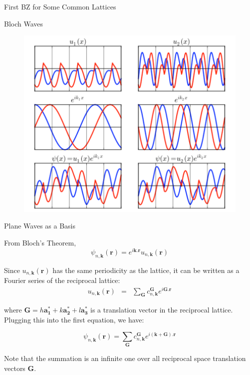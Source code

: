 \documentclass[aspectratio=169]{beamer}
\let \vec \mathbf
\begin{document}
\begin{frame}{First BZ for Some Common Lattices}
\end{frame} 

\begin{frame}{Bloch Waves}
\begin{figure}
    \centering
    \includegraphics[width=0.5\linewidth]{lectures/figures/7_Bloch_Waves.png}
\end{figure} 
\end{frame} 

\begin{frame}{Plane Waves as a Basis}

From Bloch's Theorem, 
\begin{equation*}
\psi_{n,\vec{k}}(\vec{r}) = e^{i\vec{k}.\vec{r}}u_{n,\vec{k}}(\vec{r})
\end{equation*} 

Since $u_{n,\vec{k}}(\vec{r})$ has the same periodicity as the lattice, it can be written as a Fourier series of the reciprocal lattice:
\begin{eqnarray*}
u_{n,\vec{k}}(\vec{r}) & = & \sum_{\vec{G}} c^{\vec{G}}_{n,\vec{k}} e^{i\vec{G}.\vec{r}}
\end{eqnarray*} 

where $\vec{G} = h \vec{a_1^*} + k \vec{a_2^*} + l \vec{a_3^*}$ is a translation vector in the reciprocal lattice. Plugging this into the first equation, we have:

\begin{equation*}
\psi_{n,\vec{k}}(\vec{r}) = \sum_{\vec{G}} c^{\vec{G}}_{n,\vec{k}} e^{i(\vec{k}+\vec{G}).\vec{r}}
\end{equation*} 

Note that the summation is an infinite one over all reciprocal space translation vectors $\vec{G}$.

\end{frame} 
\end{document}
